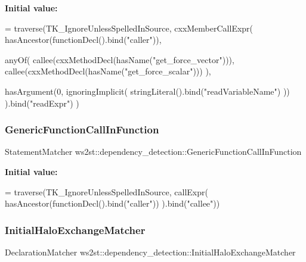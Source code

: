 {\bfseries Initial value\+:}
\begin{DoxyCode}
= traverse(TK\_IgnoreUnlessSpelledInSource, cxxMemberCallExpr(
        hasAncestor(functionDecl().bind(\textcolor{stringliteral}{"caller"})),

        anyOf(
            callee(cxxMethodDecl(hasName(\textcolor{stringliteral}{"get\_force\_vector"}))),
            callee(cxxMethodDecl(hasName(\textcolor{stringliteral}{"get\_force\_scalar"})))
        ),

        hasArgument(0, ignoringImplicit( stringLiteral().bind(\textcolor{stringliteral}{"readVariableName"}) ))
    ).bind(\textcolor{stringliteral}{"readExpr"})
)
\end{DoxyCode}
\mbox{\label{namespacews2st_1_1dependency__detection_ae821707e6bb54817ce26e569ae3b30da}} 
\subsubsection{\texorpdfstring{Generic\+Function\+Call\+In\+Function}{GenericFunctionCallInFunction}}
{\footnotesize\ttfamily Statement\+Matcher ws2st\+::dependency\+\_\+detection\+::\+Generic\+Function\+Call\+In\+Function}

{\bfseries Initial value\+:}
\begin{DoxyCode}
= traverse(TK\_IgnoreUnlessSpelledInSource, callExpr(
    hasAncestor(functionDecl().bind(\textcolor{stringliteral}{"caller"}))
).bind(\textcolor{stringliteral}{"callee"}))
\end{DoxyCode}
\mbox{\label{namespacews2st_1_1dependency__detection_a4f1b7b6a99e43f2c522554396c0b3a09}} 
\subsubsection{\texorpdfstring{Initial\+Halo\+Exchange\+Matcher}{InitialHaloExchangeMatcher}}
{\footnotesize\ttfamily Declaration\+Matcher ws2st\+::dependency\+\_\+detection\+::\+Initial\+Halo\+Exchange\+Matcher}


